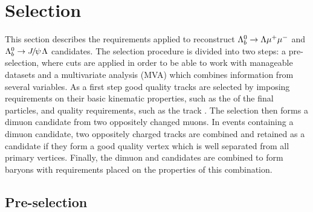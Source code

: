 \section{Selection}
\label{sec:Lb_selection}

This section describes the requirements applied to reconstruct ${{\Lambda}^0_{b}}\rightarrow{\ensuremath{\Lambda}}{\ensuremath{\mu^+\mu^-}}$ and $\Lb\to\jpsi\Lz$ candidates. 
The selection procedure is divided into two steps: a pre-selection, where cuts are applied in order to be able to work
with manageable datasets and a multivariate analysis (MVA) which combines information from several variables.
As a first step good quality tracks are selected by imposing requirements on their basic kinematic properties, 
such as the \pt of the final particles, and quality requirements, such as the track \chisq.
The selection then forms a dimuon candidate from two oppositely changed muons. 
In events containing a dimuon candidate, two oppositely charged tracks are combined
and retained as a \Lz candidate if they form a good quality vertex which is well separated
from all primary vertices. Finally, the dimuon and \Lz candidates are combined to form \Lb
baryons with requirements placed on the properties of this combination. 


\subsection{Pre-selection}
\label{sec:Lb_stripping}

